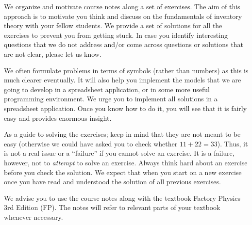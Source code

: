 
We organize and motivate course notes along a set of exercises. The aim of this approach is to motivate you think and discuss on the fundamentals of inventory theory with your fellow students. We provide a set of solutions for all the exercises to prevent you from getting stuck. In case you identify interesting questions that we do not address and/or come across questions or solutions that are not clear, please let us know. 

We often formulate problems in terms of symbols (rather than numbers) as this is much clearer eventually. It will also help you implement the models that we are going to develop in a spreadsheet application, or in some more useful programming environment. We urge you to implement all solutions in a spreadsheet application. Once you know how to do it, you will see that it is fairly easy and provides enormous insight.

As a guide to solving the exercises; keep in mind that they are not meant to be easy (otherwise we could have asked you to check whether $11+22=33$). Thus, it is not a real issue or a ``failure'' if you cannot solve an exercise. It is a failure, however, not to \emph{attempt} to solve an exercise. Always think hard about an exercise before you check the solution. We expect that when you start on a new exercise once you have read and understood the solution of all previous exercises. 

We advise you to use the course notes along with the textbook Factory Physics 3rd Edition (FP). The notes will refer to relevant parts of your textbook whenever necessary. 
